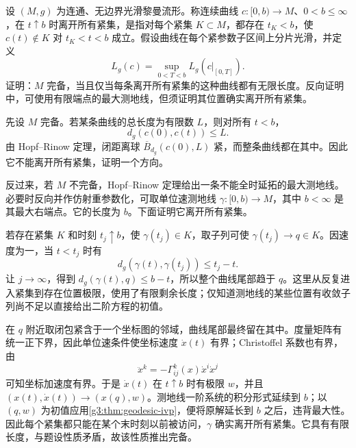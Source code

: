 \begin{exercise}\label{g3:ex:completeness-escaping-curves}
	设 \((M,g)\) 为连通、无边界光滑黎曼流形。称连续曲线 \(c:[0,b)\to M\)、\(0<b\le\infty\)，在 \(t\uparrow b\) 时离开所有紧集，是指对每个紧集 \(K\subset M\)，都存在 \(t_K<b\)，使 \(c(t)\notin K\) 对 \(t_K<t<b\) 成立。假设曲线在每个紧参数子区间上分片光滑，并定义
	\[
		L_g(c)=\sup_{0<T<b}L_g(c|_{[0,T]}).
	\]
	证明：\(M\) 完备，当且仅当每条离开所有紧集的这种曲线都有无限长度。反向证明中，可使用有限端点的最大测地线，但须证明其位置确实离开所有紧集。
\end{exercise}
\begin{solution}
	先设 \(M\) 完备。若某条曲线的总长度为有限数 \(L\)，则对所有 \(t<b\)，
	\[
		d_g(c(0),c(t))\le L.
	\]
	由 Hopf--Rinow 定理，闭距离球 \(\overline B_{d_g}(c(0),L)\) 紧，而整条曲线都在其中。因此它不能离开所有紧集，证明一个方向。

	反过来，若 \(M\) 不完备，Hopf--Rinow 定理给出一条不能全时延拓的最大测地线。必要时反向并作仿射重参数化，可取单位速测地线 \(\gamma:[0,b)\to M\)，其中 \(b<\infty\) 是其最大右端点。它的长度为 \(b\)。下面证明它离开所有紧集。

	若存在紧集 \(K\) 和时刻 \(t_j\uparrow b\)，使 \(\gamma(t_j)\in K\)，取子列可使 \(\gamma(t_j)\to q\in K\)。因速度为一，当 \(t<t_j\) 时有
	\[
		d_g(\gamma(t),\gamma(t_j))\le t_j-t.
	\]
	让 \(j\to\infty\)，得到 \(d_g(\gamma(t),q)\le b-t\)，所以整个曲线尾部趋于 \(q\)。这里从反复进入紧集到存在位置极限，使用了有限剩余长度；仅知道测地线的某些位置有收敛子列尚不足以直接给出二阶方程的初值。

	在 \(q\) 附近取闭包紧含于一个坐标图的邻域，曲线尾部最终留在其中。度量矩阵有统一正下界，因此单位速条件使坐标速度 \(\dot x(t)\) 有界；Christoffel 系数也有界，由
	\[
		\ddot x^k=-\Gamma^k_{ij}(x)\dot x^i\dot x^j
	\]
	可知坐标加速度有界。于是 \(\dot x(t)\) 在 \(t\uparrow b\) 时有极限 \(w\)，并且 \((x(t),\dot x(t))\to(x(q),w)\)。测地线一阶系统的积分形式延续到 \(b\)；以 \((q,w)\) 为初值应用\cref{g3:thm:geodesic-ivp}，便将原解延长到 \(b\) 之后，违背最大性。因此每个紧集都只能在某个末时刻以前被访问，\(\gamma\) 确实离开所有紧集。它具有有限长度，与题设性质矛盾，故该性质推出完备。
\end{solution}

